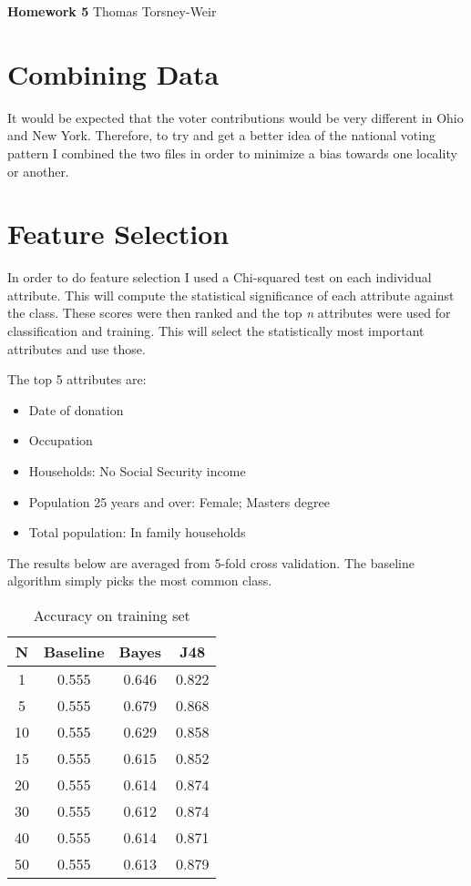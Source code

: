 \documentclass[10pt]{article}
\begin{document}
{\bf Homework 5} \hfill {\raggedleft Thomas Torsney-Weir}

\section{Combining Data}
It would be expected that the voter contributions would be very different
in Ohio and New York.  Therefore, to try and get a better idea of the national
voting pattern I combined the two files in order to minimize a bias towards
one locality or another.

\section{Feature Selection}
In order to do feature selection I used a Chi-squared test on each individual
attribute.  This will compute the statistical significance of each attribute
against the class.  These scores were then ranked and the top \emph{n} 
attributes were used for classification and training.  This will select the 
statistically most important attributes and use those.

The top 5 attributes are:
\begin{itemize}
\item Date of donation
\item Occupation
\item Households: No Social Security income
\item Population 25 years and over: Female; Masters degree
\item Total population: In family households
\end{itemize}

The results below are averaged from 5-fold cross validation.  The baseline
algorithm simply picks the most common class.

\begin{table}[h]
\begin{center}
\begin{tabular}{|c|c|c|c|}
\hline
N & Baseline & Bayes & J48 \\
 \hline\hline 
1 & 0.555 & 0.646 & 0.822 \\
5 & 0.555 & 0.679 & 0.868 \\
10 & 0.555 & 0.629 & 0.858 \\
15 & 0.555 & 0.615 & 0.852 \\
20 & 0.555 & 0.614 & 0.874 \\
30 & 0.555 & 0.612 & 0.874 \\
40 & 0.555 & 0.614 & 0.871 \\
50 & 0.555 & 0.613 & 0.879 \\
\hline
\end{tabular}
\end{center}
\caption{Accuracy on training set}
\end{table}
\end{document}
